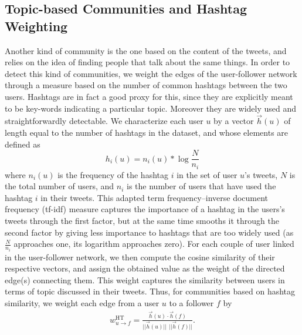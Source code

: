 \subsection{Topic-based Communities and Hashtag Weighting}
\label{sec:method-topic}

Another kind of community is the one based on the content of the tweets, and relies on the idea of finding people that talk about the same things. In order to detect this kind of communities, we weight the edges of the user-follower network through a measure based on the number of common hashtags between the two users. Hashtags are in fact a good proxy for this, since they are explicitly meant to be key-words indicating a particular topic. Moreover they are widely used and straightforwardly detectable. We characterize each user $u$ by a vector $\vec{h}(u)$ of length equal to the number of hashtags in the dataset, and whose elements are defined as
\begin{equation}
h_i(u) = n_i(u) * \log{ \frac{N}{n_i} }
\end{equation}
where $n_i(u)$ is the frequency of the hashtag $i$ in the set of user $u$'s tweets, $N$ is the total number of users, and $n_i$ is the number of users that have used the hashtag $i$ in their tweets. This adapted term frequency--inverse document frequency (tf-idf) measure \cite{salton_introduction_1983} captures the importance of a hashtag in the users's tweets through the first factor, but at the same time smooths it through the second factor by giving less importance to hashtags that are too widely used (as $\frac{N}{n_i}$ approaches one, its logarithm approaches zero). For each couple of user linked in the user-follower network, we then compute the cosine similarity of their respective vectors, and assign the obtained value as the weight of the directed edge(s) connecting them. This weight captures the similarity between users in terms of topic discussed in their tweets. Thus, for communities based on hashtag similarity, we weight each edge from a user $u$ to a follower $f$ by 
\begin{align}
	w_{u \to f}^{\text{HT}} = \frac{\vec{h}(u) \cdot \vec{h}(f)}{||\vec{h}(u)|| \ \ ||\vec{h}(f)||}.
\end{align}